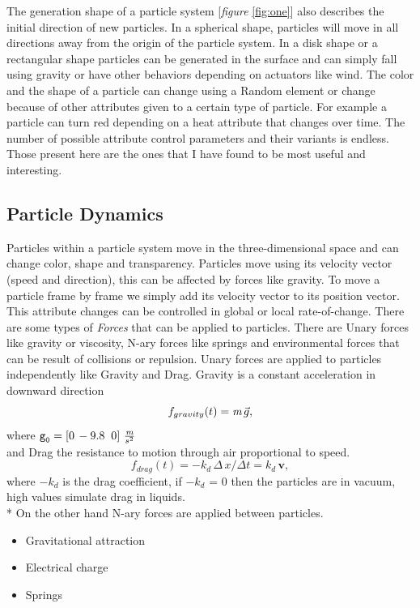 	The generation shape of a particle system [\emph{figure} \ref{fig:one}] also describes the initial direction of new particles. In a spherical shape, particles will move in all directions away from the origin of the particle system. In a disk shape or a rectangular shape particles can be generated in the surface and can simply fall using gravity or have other behaviors depending on actuators like wind. The color and the shape of a particle can change using a Random element or change because of other attributes given to a certain type of particle. For example a particle can turn red depending on a heat attribute that changes over time.
	The number of possible attribute control parameters and their variants is endless. Those present here are the ones that I have found to be most useful and interesting.
 
 
\subsection{Particle Dynamics}
Particles within a particle system move in the three-dimensional space and can change color, shape and transparency. Particles move using its velocity vector (speed and direction), this can be affected by forces like gravity. To move a particle frame by frame we simply add its velocity vector to its position vector. This attribute changes can be controlled in global or local rate-of-change.
	There are some types of \emph{Forces} that can be applied to particles. There are Unary forces like
gravity or viscosity, N-ary forces like springs and environmental forces that can be result of collisions or repulsion. Unary forces are applied to particles independently like Gravity and Drag. Gravity is a constant acceleration in downward direction 
\begin{equation}
\label{eqn:03}
f_{gravity}(t) = \emph{m}\,\vec{g},
\end{equation}
where $\texttt{g}_{\texttt{0}} = \left [ 0\, -9.8\; \; 0 \right ]\, \frac{\emph{m}}{s^{2}}$
\\
and Drag the resistance to motion through air proportional to speed.
\begin{equation}
\label{eqn:04}
f_{drag}(t) = -k_{d}\, \Delta\, x / \Delta t = k_{d}\, \textbf{v},
\end{equation}
where $-k_{d}$ is the drag coefficient, if $-k_{d}$ = 0 then the particles are in vacuum, high values simulate drag in liquids.\\*
On the other hand N-ary forces are applied between particles.
\begin{itemize}
\item Gravitational attraction  
\item Electrical charge
\item Springs
\end{itemize}
